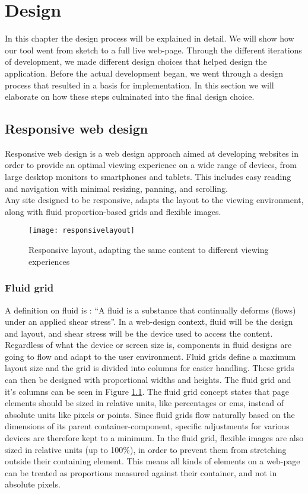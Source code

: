 \chapter{Design}
In this chapter the design process will be explained in detail. We will show how our tool went from sketch to a full live web-page. 
Through the different iterations of development, we made different design choices that helped design the application. Before the actual development began, we went
through a design process that resulted in a basis for implementation. In this section we will elaborate on how these steps culminated into the final design choice.
\section{Responsive web design}
Responsive web design\cite{responsivearticle} is a web design approach aimed at developing websites in order to provide an optimal viewing experience on a wide range of devices, from large desktop monitors to smartphones and tablets. This includes easy reading and navigation with minimal resizing, panning, and scrolling.\\
Any site designed to be responsive, adapts the layout to the viewing environment, along with fluid proportion-based grids and flexible images.\\
\begin{figure}[h!]
\label{responsivelayout}
\centering
	\texttt{[image: responsivelayout]}
\caption{Responsive layout, adapting the same content to different viewing experiences}
\end{figure}

\subsection{Fluid grid}
A definition on fluid is : ``A fluid is a substance that continually deforms (flows) under an applied shear stress''\cite{fluidgrid}. In a web-design context, fluid will be the design and layout, and shear stress will be the device used to access the content.
Regardless of what the device or screen size is, components in fluid designs are going to flow and adapt to the user environment. Fluid grids define a maximum layout size and the grid is divided into columns for easier handling. These grids can then be designed with proportional widths and heights. The fluid grid and it's columns can be seen in Figure \ref{responsivelayout}.
The fluid grid\cite{fluidgrid, fluidarticle} concept states that page elements should be sized in relative units, like percentages or ems, instead of absolute units like pixels or points. Since fluid grids flow naturally based on the dimensions of its parent container-component, specific adjustments for various devices are therefore kept to a minimum. In the fluid grid, flexible images are also sized in relative units (up to 100\%), in order to prevent them from stretching outside their containing element\cite{fluidimages}. This means all kinds of elements on a web-page can be treated as proportions measured against their container, and not in absolute pixels. 

